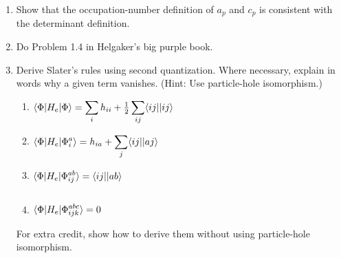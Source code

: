 \documentclass[11pt]{article}
\numberwithin{equation}{section}
\begin{document}
\begin{enumerate}
\item
  Show that the occupation-number definition of $a_p$ and $c_p$ is consistent with the determinant definition.

\item
  Do Problem 1.4 in Helgaker's big purple book.

\item
  Derive Slater's rules using second quantization.
  Where necessary, explain in words why a given term vanishes.
  (Hint: Use particle-hole isomorphism.)
  \begin{enumerate}
  \item
    ${\displaystyle
      \langle\Phi |H_e|\Phi \rangle
    =
      \sum_i
      h_{ii}
    +
      \tfrac{1}{2}
      \sum_{ij}
      \langle ij||ij\rangle
    }$
  \item
    ${\displaystyle
      \langle\Phi |H_e|\Phi _i^a\rangle
    =
      h_{ia}
    +
      \sum_j
      \langle ij||aj\rangle
    }$
  \item
    ${\displaystyle
      \langle\Phi |H_e|\Phi _{ij}^{ab}\rangle
    =
      \langle ij||ab\rangle
      \vphantom{\sum_j}
    }$
  \item
    ${\displaystyle
      \langle\Phi |H_e|\Phi _{ijk}^{abc}\rangle
    =
      0
    }$
  \end{enumerate}
  For extra credit, show how to derive them without using particle-hole isomorphism.
\end{enumerate}
\end{document}
